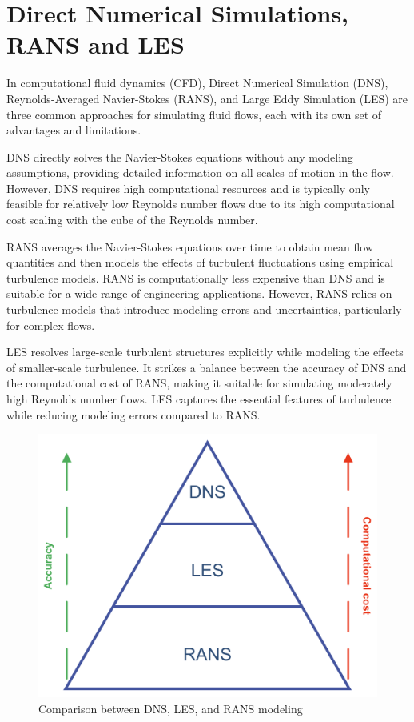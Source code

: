 \section{Direct Numerical Simulations, RANS and LES}
\label{sec:DirectNumericalSimulationsRANSAndLES} 

In computational fluid dynamics (CFD), Direct Numerical Simulation (DNS), Reynolds-Averaged Navier-Stokes (RANS), and Large Eddy Simulation (LES) are three common approaches for simulating fluid flows, each with its own set of advantages and limitations.

DNS directly solves the Navier-Stokes equations without any modeling assumptions, providing detailed information on all scales of motion in the flow. However, DNS requires high computational resources and is typically only feasible for relatively low Reynolds number flows due to its high computational cost scaling with the cube of the Reynolds number.

RANS averages the Navier-Stokes equations over time to obtain mean flow quantities and then models the effects of turbulent fluctuations using empirical turbulence models. RANS is computationally less expensive than DNS and is suitable for a wide range of engineering applications. However, RANS relies on turbulence models that introduce modeling errors and uncertainties, particularly for complex flows.

LES resolves large-scale turbulent structures explicitly while modeling the effects of smaller-scale turbulence. It strikes a balance between the accuracy of DNS and the computational cost of RANS, making it suitable for simulating moderately high Reynolds number flows. LES captures the essential features of turbulence while reducing modeling errors compared to RANS.

\begin{figure}[H]
    \centering
    \includegraphics[width=0.4\linewidth]{images/dns_les_rans.png}
    \caption{Comparison between DNS, LES, and RANS modeling}
    \label{fig:dns_les_rans}
\end{figure}

